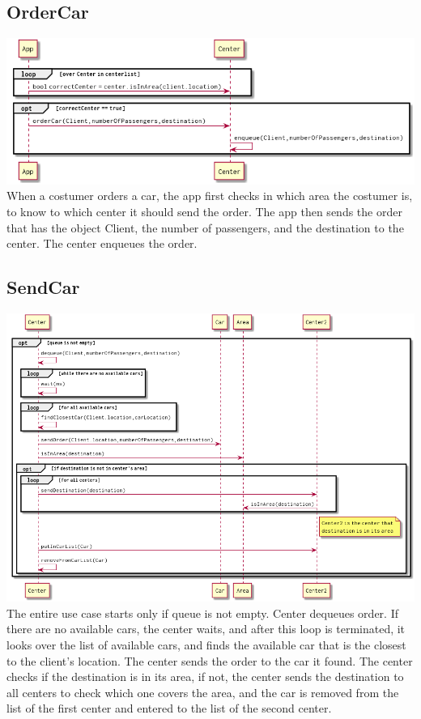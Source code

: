 \documentclass[a4paper]{article}
\begin{document}
\subsection*{OrderCar}
\includegraphics[width=1\textwidth]{../Diagrams/orderCar.png}\\
When a costumer orders a car, the app first checks in which area the costumer is, to know to which center it should send the order. The app then sends the order that has the object Client, the number of passengers, and the destination to the center. The center enqueues the order.
\subsection*{SendCar}
\includegraphics[width=1\textwidth]{../Diagrams/sendCar.png}\\
The entire use case starts only if queue is not empty. Center dequeues order. If there are no available cars, the center waits, and after this loop is terminated, it looks over the list of available cars, and finds the available car that is the closest to the client's location. The center sends the order to the car it found. The center checks if the destination is in its area, if not, the center sends the destination to all centers to check which one covers the area, and the car is removed from the list of the first center and entered to the list of the second center. 
\end{document}
